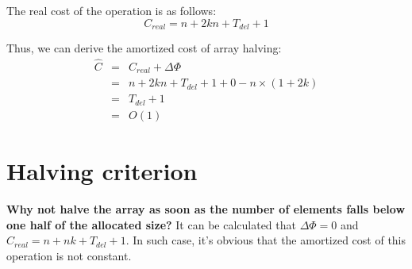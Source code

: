   The real cost of the operation is as follows:
  \[
  C_{real} = n + 2kn + T_{del} + 1
  \]

  Thus, we can derive the amortized cost of array halving:
  \[
  \begin{array}{lcl}
  \hat C & = & C_{real} + \Delta \Phi \\
         & = & n + 2kn + T_{del} + 1 + 0 - n \times (1 + 2k) \\
         & = & T_{del} + 1 \\
         & = & O(1)
  \end{array}
  \]

\section{Halving criterion}
  \textbf{Why not halve the array as soon as the number of elements falls below one half of the allocated size?}
  It can be calculated that $\Delta \Phi = 0$ and $C_{real} = n + nk + T_{del} + 1$. In such case, it's obvious that the amortized cost of this operation is not constant.
